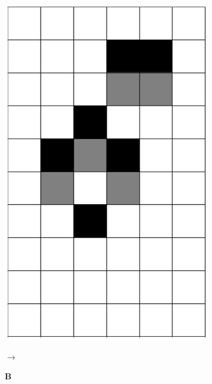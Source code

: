 \documentclass[12pt]{article}
\numberwithin{figure}{section} %
\begin{document}
\begin{figure}[H]
\begin{subfigure}{0.3\textwidth}
     		\includegraphics[angle=270,width=\linewidth]{Section4/3.2}
     		\subcaption{}
   	\end{subfigure}
   	\begin{subfigure}[t]{0.03\textwidth}
      		{\LARGE$\xrightarrow{}$}
   	\end{subfigure}
      	\newline
   	\setcounter{subfigure}{0}
     	\begin{subfigure}[t]{0.03\textwidth}
    		\textbf{B}
  	\end{subfigure}
   	\begin{subfigure}{0.3\textwidth}
    		\centering

\end{subfigure}
\end{figure}
\end{document}
